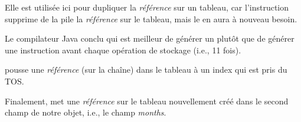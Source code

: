 Elle est utilisée ici pour dupliquer la \emph{référence} sur un tableau, car l'instruction
 supprime de la pile la \emph{référence} sur le tableau, mais le 
en aura à nouveau besoin.

Le compilateur Java conclu qui est meilleur de générer un  plutôt que de générer
une instruction  avant chaque opération de stockage (i.e., 11 fois).

 pousse une \emph{référence} (sur la chaîne) dans le tableau à un index
qui est pris du \ac{TOS}.

Finalement,  met une \emph{référence} sur le tableau nouvellement
créé dans le second champ de notre objet, i.e., le champ \emph{months}.

